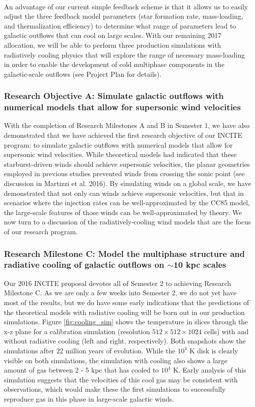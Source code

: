 \documentclass[11pt,letterpaper,english]{article}
\begin{document}
~\\
An advantage of our current simple feedback scheme is that it allows us to easily adjust the three feedback model parameters (star formation rate, mass-loading, and thermalization efficiency) to determine what range of parameters lead to galactic outflows that can cool on large scales. With our remaining 2017 allocation, we will be able to perform three production simulations with radiatively cooling physics that will explore the range of necessary mass-loading in order to enable the development of cold multiphase components in the
galactic-scale outflows (see Project Plan for details).

\subsubsection{Research Objective A: Simulate galactic outflows with numerical models that allow for supersonic wind velocities}

With the completion of Research Milestones A and B in Semester 1, we have also demonstrated that we have achieved the first research objective of our INCITE program: to simulate galactic outflows with numerical models that allow for supersonic wind velocities. While theoretical models had indicated that these starburst-driven winds should achieve supersonic velocities, the planar geometries employed in previous studies prevented winds from crossing the sonic point (see discussion in Martizzi et al. 2016). By simulating winds on a global scale, we have demonstrated that not only can winds achieve supersonic velocities, but that in scenarios where the injection rates can be well-approximated by the CC85 model, the large-scale features of those winds can be well-approximated by theory. We now turn to a discussion of the radiatively-cooling wind models that are the focus of our research program.

\subsubsection{Research Milestone C: Model the multiphase structure and radiative cooling of galactic outflows on $\sim$10 kpc scales}

Our 2016 INCITE proposal devotes all of Semester 2 to achieving Research Milestone C. As we are only a few weeks into Semester 2, we do not yet have most of the results, but we do have some early indications that the predictions of the theoretical models with radiative cooling will be born out in our production simulations. Figure \ref{fig:cooling_sim} shows the temperature in slices through the x-z plane for a calibration simulation (resolution $512\times512\times1024$ cells) with and without radiative cooling (left and right, respectively). Both snapshots show the simulations after 22 million years of evolution. While the $10^4$ K disk is clearly visible on both simulations, the simulation with cooling also shows a large amount of gas between 2 - 5 kpc that has cooled to $10^4$ K. Early analysis of this simulation suggests that the velocities of this cool gas may be consistent with observations, which would make these the first simulations to successfully reproduce gas in this phase in large-scale galactic winds.
\end{document}
